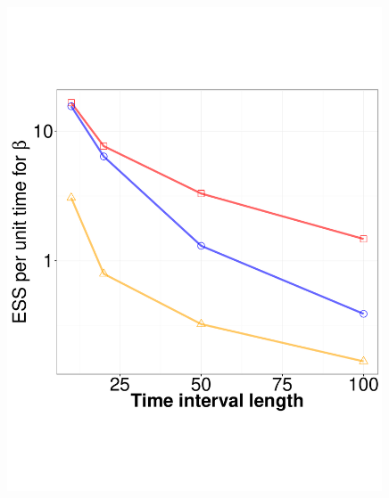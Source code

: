 {\begin{figure}
\begin{minipage}[hp]{0.24\linewidth}
    \includegraphics [width=0.99\textwidth, angle=0]{figs/ESS_vs_t_beta_fixobservation.pdf}
  \end{minipage}
  \begin{minipage}[hp]{0.24\linewidth}
  \centering

\end{minipage}
\end{figure}}
